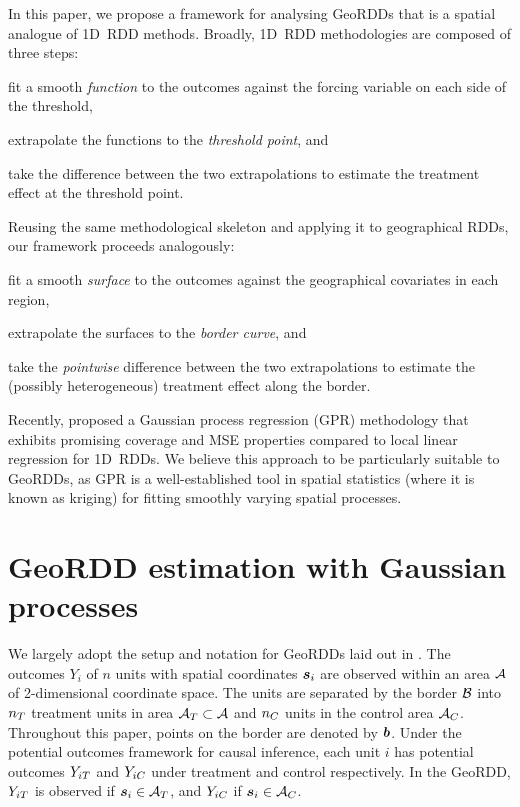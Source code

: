 \documentclass{article}
\begin{document}
\label{sec:framework}
In this paper, we propose a framework for analysing GeoRDDs that is a spatial analogue of 1D~RDD methods.
Broadly, 1D~RDD methodologies are composed of three steps:
\begin{flatlist}
    \item
        fit a smooth \emph{function} to the outcomes against the forcing variable on each side of the threshold,
    \item
        extrapolate the functions to the \emph{threshold point}, and
    \item
        take the difference between the two extrapolations to estimate the treatment effect at the threshold point.
\end{flatlist}
Reusing the same methodological skeleton and applying it to geographical RDDs, our framework proceeds analogously:
\begin{flatlist}
    \item
        fit a smooth \emph{surface} to the outcomes against the geographical covariates in each region,
    \item
        extrapolate the surfaces to the \emph{border curve}, and
    \item
        take the \emph{pointwise} difference between the two extrapolations to estimate the (possibly heterogeneous) treatment effect along the border.
\end{flatlist}

Recently, \cite{Branson:2017qy} proposed a Gaussian process regression (GPR) methodology that exhibits promising coverage and MSE properties compared to local linear regression for 1D~RDDs.
We believe this approach to be particularly suitable to GeoRDDs, as GPR is a well-established tool in spatial statistics (where it is known as kriging) for fitting smoothly varying spatial processes.

\section{GeoRDD estimation with Gaussian processes}
\label{sec:geordd_model}

We largely adopt the setup and notation for GeoRDDs laid out in \cite{keele_titiunik_2015}.
The outcomes \(Y_i\) of \(n\) units with spatial coordinates \(\bm{s}_i\) are observed within an area \(\mathcal{A}\) of 2-dimensional coordinate space.
The units are separated by the border \(\mathcal{B}\) into \(n_T\) treatment units in area \(\mathcal{A}{}_{T} \subset \mathcal{A}\)
and \(n_C\) units in the control area \(\mathcal{A}{}_{C}\).
Throughout this paper, points on the border are denoted by \(\bm{b}\).
Under the potential outcomes framework for causal inference, each unit \(i\) has potential outcomes \(Y_{iT}\) and \(Y_{iC}\) under treatment and control respectively.
In the GeoRDD, \(Y_{iT}\) is observed if \(\bm{s}_i \in \mathcal{A}{}_{T}\), and \(Y_{iC}\) if \(\bm{s}_i \in \mathcal{A}{}_{C}\).
\end{document}
